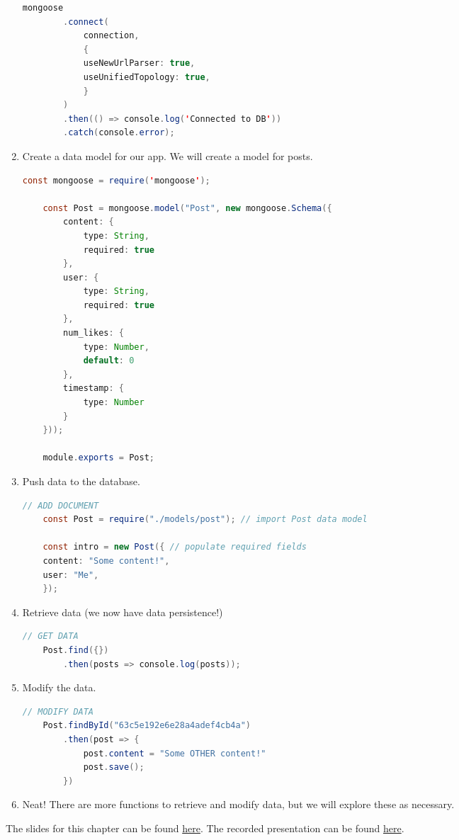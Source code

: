 \begin{enumerate}
\begin{lstlisting}[language=Java]
    mongoose
        .connect(
            connection,
            {
            useNewUrlParser: true,
            useUnifiedTopology: true,
            }
        )
        .then(() => console.log('Connected to DB'))
        .catch(console.error);
    \end{lstlisting}
    \item Create a data model for our app. We will create a model for posts.
    \begin{lstlisting}[language=Java]
    const mongoose = require('mongoose');

    const Post = mongoose.model("Post", new mongoose.Schema({
        content: {
            type: String,
            required: true
        },
        user: {
            type: String,
            required: true
        },
        num_likes: {
            type: Number,
            default: 0
        },
        timestamp: {
            type: Number
        }
    }));

    module.exports = Post;
    \end{lstlisting}
    \item Push data to the database.
    \begin{lstlisting}[language=Java]
    // ADD DOCUMENT
    const Post = require("./models/post"); // import Post data model

    const intro = new Post({ // populate required fields
    content: "Some content!",
    user: "Me",
    });
    \end{lstlisting}
    \item Retrieve data (we now have data persistence!)
    \begin{lstlisting}[language=Java]
    // GET DATA
    Post.find({})
        .then(posts => console.log(posts));
    \end{lstlisting}
    \item Modify the data.
    \begin{lstlisting}[language=Java]
    // MODIFY DATA
    Post.findById("63c5e192e6e28a4adef4cb4a")
        .then(post => {
            post.content = "Some OTHER content!"
            post.save();
        })
    \end{lstlisting}
    \item Neat! There are more functions to retrieve and modify data, but we will explore these as necessary.
\end{enumerate}

\begin{kaobox}[title=Slides and Recording]
    The slides for this chapter can be found \href{https://docs.google.com/presentation/d/1EuZU5pkk456BShSwnUgeFDVkcUJEoUCYIzOFuUEalfY/edit?usp=share_link}{here}. The recorded presentation can be found \href{https://youtu.be/5_pIkemZDoY}{here}.
\end{kaobox}
